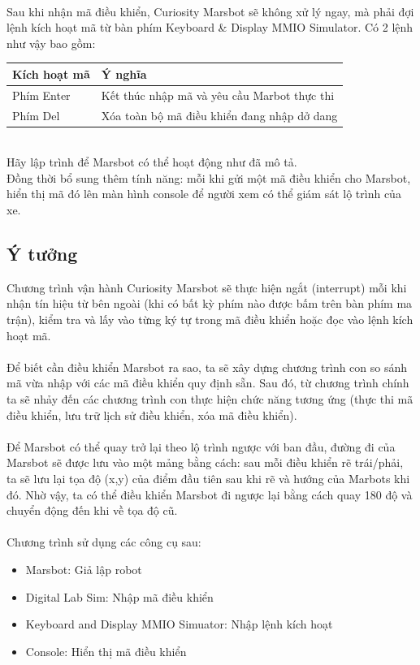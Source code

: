\documentclass[a4paper,12pt]{article}
\begin{document}
	\noindent
	\\
	Sau khi nhận mã điều khiển, Curiosity Marsbot sẽ không xử lý ngay, mà phải đợi lệnh kích hoạt mã từ bàn phím Keyboard \& Display MMIO Simulator. Có 2 lệnh như vậy bao gồm:
	\begin{table}[!h]
		\label{ba1}
		\begin{tabularx}{\textwidth}{|l|X|} \hline
			\textbf{Kích hoạt mã} & \textbf{Ý nghĩa}  \\ \hline 
			Phím Enter  & Kết thúc nhập mã và yêu cầu Marbot thực thi \\ \hline
			Phím Del & Xóa toàn bộ mã điều khiển đang nhập dở dang\\  \hline
		\end{tabularx}
	\end{table}
	\\
	\noindent
	Hãy lập trình để Marsbot có thể hoạt động như đã mô tả. \\
	Đồng thời bổ sung thêm tính năng: mỗi khi gửi một mã điều khiển cho Marsbot, hiển thị mã đó lên màn hình console để người xem có thể giám sát lộ trình của xe.
	\clearpage
	\subsection{Ý tưởng}
	    Chương trình vận hành Curiosity Marsbot sẽ thực hiện ngắt (interrupt) mỗi khi nhận tín hiệu từ bên ngoài (khi có bất kỳ phím nào được bấm trên bàn phím ma trận), kiểm tra và lấy vào từng ký tự trong mã điều khiển hoặc đọc vào lệnh kích hoạt mã. \\ \\
	    Để biết cần điều khiển Marsbot ra sao, ta sẽ xây dựng chương trình con so sánh mã vừa nhập với các mã điều khiển quy định sẵn. Sau đó, từ chương trình chính ta sẽ nhảy đến các chương trình con thực hiện chức năng tương ứng (thực thi mã điều khiển, lưu trữ lịch sử điều khiển, xóa mã điều khiển).\\ \\
	    Để Marsbot có thể quay trở lại theo lộ trình ngược với ban đầu,  đường đi của Marsbot sẽ được lưu vào một mảng bằng cách: sau mỗi điều khiển rẽ trái/phải, ta sẽ lưu lại tọa độ (x,y) của điểm đầu tiên sau khi rẽ và hướng của Marbots khi đó. Nhờ vậy, ta có thể điều khiển Marsbot đi ngược lại bằng cách quay 180 độ và chuyển động đến khi về tọa độ cũ.\\ \\
	    \noindent
	    Chương trình sử dụng các công cụ sau:
	    \begin{itemize}
	    \item Marsbot: Giả lập robot
	    \item Digital Lab Sim: Nhập mã điều khiển
	    \item Keyboard and Display MMIO Simuator: Nhập lệnh kích hoạt
	    \item Console: Hiển thị mã điều khiển
	    \end{itemize}
	\clearpage
\end{document}
